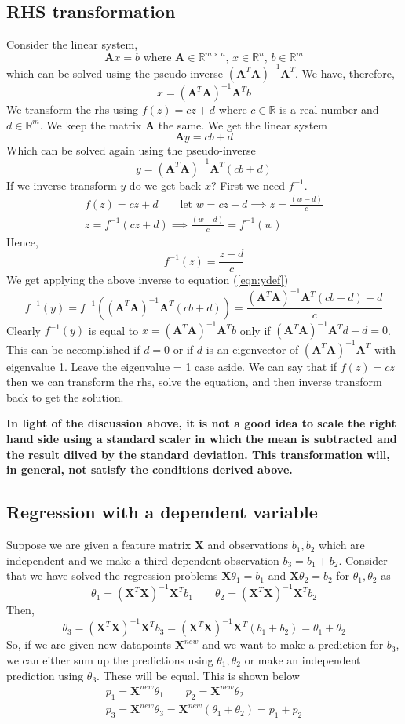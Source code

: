 \documentclass{article}
\newcommand{\beq}{\begin{equation}}
\newcommand{\eeq}{\end{equation}}
\newcommand{\ber}{\begin{eqnarray}}
\newcommand{\eer}{\end{eqnarray}}
\begin{document}
\subsection{RHS transformation}
Consider the linear system,
\beq
\pmb{A}x = b \text{ where } \pmb{A}\in\mathbb{R}^{m\times{n}},\,x\in\mathbb{R}^n,\,b\in\mathbb{R}^m
\eeq
which can be solved using the pseudo-inverse $(\pmb{A}^{T}\pmb{A})^{-1}\pmb{A}^T$. We have, therefore,
\beq
x = (\pmb{A}^{T}\pmb{A})^{-1}\pmb{A}^Tb
\eeq
We transform the rhs using $f(z)=cz+d$ where $c\in\mathbb{R}$ is a real number and $d\in\mathbb{R}^{m}$. We keep the matrix $\pmb{A}$ the same. We get the linear system
\beq
\pmb{A}y = cb + d 
\eeq
Which can be solved again using the pseudo-inverse
\beq
\label{eqn:ydef}
y = (\pmb{A}^{T}\pmb{A})^{-1}\pmb{A}^T(cb + d)
\eeq
If we inverse transform $y$ do we get back $x$? First we need $f^{-1}$.
\ber
f(z)=cz+d \qquad \text{let } w = cz+d \implies z =\frac{(w-d)}{c}\\
z = f^{-1}(cz+d) \implies  \frac{(w-d)}{c} = f^{-1}(w)
\eer
Hence,
\beq
f^{-1}(z) = \frac{z-d}{c}
\eeq
We get applying the above inverse to equation (\ref{eqn:ydef})
\beq
f^{-1}(y) = f^{-1}((\pmb{A}^{T}\pmb{A})^{-1}\pmb{A}^T(cb + d)) = \frac{(\pmb{A}^{T}\pmb{A})^{-1}\pmb{A}^T(cb + d) -d}{c}
\eeq
Clearly $f^{-1}(y)$ is equal to $x=(\pmb{A}^{T}\pmb{A})^{-1}\pmb{A}^Tb$ only if $(\pmb{A}^{T}\pmb{A})^{-1}\pmb{A}^Td-d = 0$. This can be accomplished if $d=0$ or if $d$ is an eigenvector of $(\pmb{A}^{T}\pmb{A})^{-1}\pmb{A}^T$ with eigenvalue 1. Leave the eigenvalue = 1 case  aside. We can say that if $f(z)=cz$ then we can transform the rhs, solve the equation, and then inverse transform back to get the solution.


\textbf{In light of the discussion above, it is not a good idea to scale the right hand side using a standard scaler in which the mean is subtracted and the result diived by the standard deviation. This transformation will, in general, not satisfy the conditions derived above.}

\subsection{Regression with a dependent variable}
Suppose we are given a feature matrix $\pmb{X}$ and observations $b_1,b_2$ which are independent and we make a third dependent observation $b_3=b_1+b_2$. Consider that we have solved the regression problems $\pmb{X}\theta_1=b_1$ and $\pmb{X}\theta_2=b_2$ for $\theta_1,\theta_2$ as
\beq
\theta_1 = (\pmb{X}^T\pmb{X})^{-1}\pmb{X}^Tb_1 \qquad \theta_2 = (\pmb{X}^T\pmb{X})^{-1}\pmb{X}^Tb_2
\eeq
Then,
\beq
\theta_3 = (\pmb{X}^T\pmb{X})^{-1}\pmb{X}^Tb_3 =(\pmb{X}^T\pmb{X})^{-1}\pmb{X}^T(b_1+b_2)  = \theta_1 + \theta_2
\eeq
So, if we are given new datapoints $\pmb{X}^{new}$ and we want to make a prediction for $b_3$, we can either sum up the predictions using $\theta_1,\theta_2$ or make an independent prediction using $\theta_3$. These will be equal. This is shown below
\ber
p_1 = \pmb{X}^{new}\theta_1 \qquad p_2 = \pmb{X}^{new}\theta_2\\
p_3 = \pmb{X}^{new}\theta_3 = \pmb{X}^{new}(\theta_1+\theta_2) = p_1 + p_2
\eer
\end{document}
